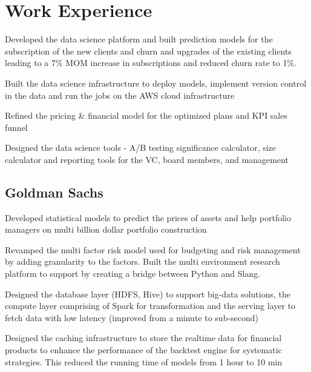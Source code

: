 \documentclass[]{resume-openfont}
\begin{document}
\begin{minipage}[t]{0.66\textwidth} 


\section{Work Experience}

\vspace{\topsep} 
\begin{tightemize}
\item Developed the data science platform and built prediction models for the subscription of the new clients and churn and upgrades of the existing clients leading to a 7\% MOM increase in subscriptions and reduced churn rate to 1\%.
\item Built the data science infrastructure to deploy models, implement version control in the data and run the jobs on the AWS cloud infrastructure
\item Refined the pricing & financial model for the optimized plans and KPI sales funnel
\item Designed the data science tools - A/B testing significance calculator, size calculator and reporting tools for the VC, board members, and management 
\end{tightemize}

\subsection{Goldman Sachs}
\begin{tightemize}
\item Developed statistical models to predict the prices of assets and help portfolio managers on multi billion dollar portfolio construction
\item Revamped the multi factor risk model used for budgeting and risk management by adding granularity to the factors. Built the multi environment research platform to support by creating a bridge between Python and Slang. 
\end{tightemize}

\begin{tightemize}
\item Designed the database layer (HDFS, Hive) to support big-data solutions, the compute layer comprising of Spark for transformation and the serving layer to fetch data with low latency (improved from a minute to sub-second)
\item Designed the caching infrastructure to store the realtime data for financial products to enhance the performance of the backtest engine for systematic strategies. This reduced the running time of models from 1 hour to 10 min
\end{tightemize}
\sectionsep


\end{minipage}
\end{document}
